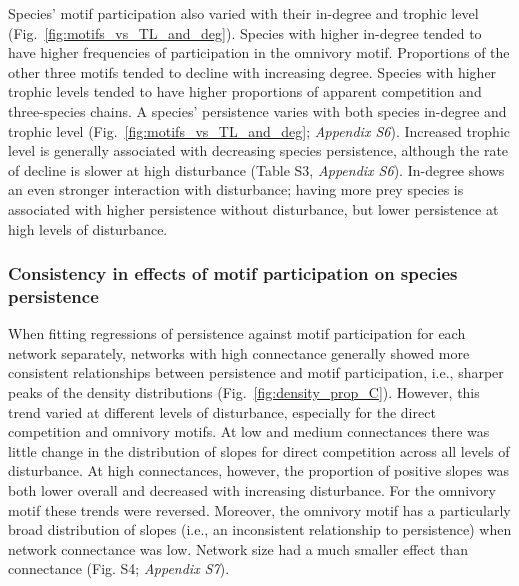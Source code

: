 \documentclass[12pt]{article}
\begin{document}
\begin{spacing}{2.0}
       Species' motif participation also varied with their in-degree and trophic level (Fig.~\ref{fig:motifs_vs_TL_and_deg}).
       Species with higher in-degree tended to have higher frequencies of participation in the omnivory motif. Proportions of the other three motifs tended to decline with increasing degree.
       Species with higher trophic levels tended to have higher proportions of apparent competition and three-species chains. 
       A species' persistence varies with both species in-degree and trophic level (Fig.~\ref{fig:motifs_vs_TL_and_deg}; \emph{Appendix S6}). Increased trophic level is generally associated with decreasing species persistence, although the rate of decline is slower at high disturbance (Table S3, \emph{Appendix S6}).
       In-degree shows an even stronger interaction with disturbance; having more prey species is associated with higher persistence without disturbance, but lower persistence at high levels of disturbance.
        
        \subsubsection*{Consistency in effects of motif participation on species persistence}
    
            When fitting regressions of persistence against motif participation for each network separately, networks with high connectance generally showed more consistent relationships between persistence and motif participation, i.e., sharper peaks of the density distributions (Fig.~\ref{fig:density_prop_C}).
            However, this trend varied at different levels of disturbance, especially for the direct competition and omnivory motifs.
            At low and medium connectances there was little change in the distribution of slopes for direct competition across all levels of disturbance. 
            At high connectances, however, the proportion of positive slopes was both lower overall and decreased with increasing disturbance. 
            For the omnivory motif these trends were reversed. 
            Moreover, the omnivory motif has a particularly broad distribution of slopes (i.e., an inconsistent relationship to persistence) when network connectance was low. 
            Network size had a much smaller effect than connectance (Fig. S4; \emph{Appendix S7}).



\end{spacing}
\end{document}
